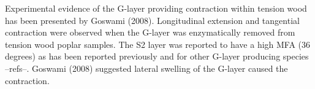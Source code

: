 Experimental evidence of the G-layer providing contraction within tension wood
has been presented by Goswami (2008). Longitudinal extension and tangential
contraction were observed when the G-layer was enzymatically removed from
tension wood poplar samples. The S2 layer was reported to have a high MFA (36
degrees) as has been reported previously and for other G-layer producing species
--refs--. Goswami (2008) suggested lateral swelling of the G-layer caused the
contraction.
